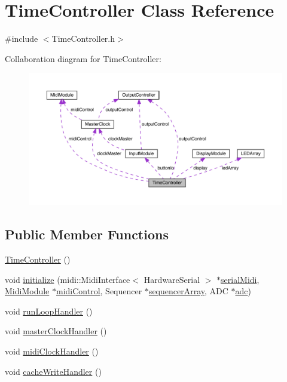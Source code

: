 \hypertarget{class_time_controller}{}\section{Time\+Controller Class Reference}
\label{class_time_controller}


{\ttfamily \#include $<$Time\+Controller.\+h$>$}



Collaboration diagram for Time\+Controller\+:
\nopagebreak
\begin{figure}[H]
\begin{center}
\leavevmode
\includegraphics[width=350pt]{class_time_controller__coll__graph}
\end{center}
\end{figure}
\subsection*{Public Member Functions}
\begin{DoxyCompactItemize}
\item 
\hyperlink{class_time_controller_a556cfa71086ae3fb76cf79d9da0056e4}{Time\+Controller} ()
\item 
void \hyperlink{class_time_controller_ae819298bde61b72b67b067b690032280}{initialize} (midi\+::\+Midi\+Interface$<$ Hardware\+Serial $>$ $\ast$\hyperlink{class_time_controller_acb753f57965d145cdb399b83062513a5}{serial\+Midi}, \hyperlink{class_midi_module}{Midi\+Module} $\ast$\hyperlink{class_time_controller_ae937d8993e143f8c340d572b21db7541}{midi\+Control}, Sequencer $\ast$\hyperlink{class_time_controller_a90cd4f79debfe1959295b79842bd5e7c}{sequencer\+Array}, A\+DC $\ast$\hyperlink{class_time_controller_a1b19c7d0b6f30005ef064f75d6e88cfd}{adc})
\item 
void \hyperlink{class_time_controller_ae1e9001e3739f3e077f4679b98650e91}{run\+Loop\+Handler} ()
\item 
void \hyperlink{class_time_controller_af3df3fed28e3d6a6a23da80b7d9e579e}{master\+Clock\+Handler} ()
\item 
void \hyperlink{class_time_controller_a56442319aea3eaed083882a0f148fe26}{midi\+Clock\+Handler} ()
\item 
void \hyperlink{class_time_controller_af64bff39f4e51f75963ae6df9e374881}{cache\+Write\+Handler} ()
\end{DoxyCompactItemize}
